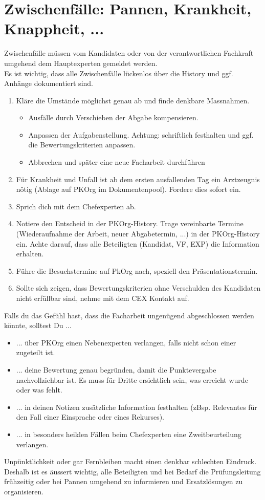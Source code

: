 \section{Zwischenfälle: Pannen, Krankheit, Knappheit, ...}
Zwischenfälle müssen vom Kandidaten oder von der verantwortlichen Fachkraft umgehend dem Hauptexperten gemeldet werden.\\Es ist wichtig, dass alle Zwischenfälle lückenlos über die History und ggf. Anhänge dokumentiert sind.

\begin{enumerate}
  \item Kläre die Umstände möglichst genau ab und finde denkbare Massnahmen.
  \begin{itemize}
    \item Ausfälle durch Verschieben der Abgabe kompensieren.
    \item Anpassen der Aufgabenstellung. Achtung: schriftlich festhalten und ggf. die Bewertungskriterien anpassen.
    \item Abbrechen und später eine neue Facharbeit durchführen
  \end{itemize}
  \item Für Krankheit und Unfall ist ab dem ersten ausfallenden Tag ein Arztzeugnis nötig (Ablage auf PKOrg im Dokumentenpool). Fordere dies sofort ein.
  \item Sprich dich mit dem Chefexperten ab.
  \item Notiere den Entscheid in der PKOrg-History. Trage vereinbarte Termine (Wiederaufnahme der Arbeit, neuer Abgabetermin, ...) in der PKOrg-History ein. Achte darauf, dass alle Beteiligten (Kandidat, VF, EXP) die Information erhalten.
  \item Führe die Besuchstermine auf PkOrg nach, speziell den Präsentationstermin.
  \item Sollte sich zeigen, dass Bewertungskriterien ohne Verschulden des Kandidaten nicht erfüllbar sind, nehme mit dem CEX Kontakt auf.
\end{enumerate}

Falls du das Gefühl hast, dass die Facharbeit ungenügend abgeschlossen werden könnte, solltest Du ...
\begin{itemize}
  \item ... über PKOrg einen Nebenexperten verlangen, falls nicht schon einer zugeteilt ist.
  \item ... deine Bewertung genau begründen, damit die Punktevergabe nachvollziehbar ist. Es muss für Dritte ersichtlich sein, was erreicht wurde oder was fehlt.
  \item ... in deinen Notizen zusätzliche Information festhalten (zBsp. Relevantes für den Fall einer Einsprache oder eines Rekurses). 
  \item ... in besonders heiklen Fällen beim Chefexperten eine Zweitbeurteilung verlangen.

\end{itemize}


Unpünktlichkeit oder gar Fernbleiben macht einen denkbar schlechten Eindruck.\\Deshalb ist es äussert wichtig, alle Beteiligten und bei Bedarf die Prüfungsleitung frühzeitig oder bei Pannen umgehend zu informieren und Ersatzlösungen zu organisieren.
